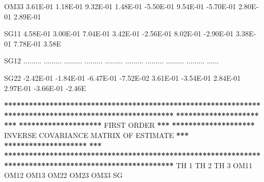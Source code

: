 \documentclass[
  11pt,
  krantz2, a4paper, twoside]{krantz}
\newenvironment{Shaded}{\begin{snugshade}}{\end{snugshade}}
\newcommand{\DecValTok}[1]{\textcolor[rgb]{0.00,0.00,0.81}{#1}}
\newcommand{\ErrorTok}[1]{\textcolor[rgb]{0.64,0.00,0.00}{\textbf{#1}}}
\newcommand{\FloatTok}[1]{\textcolor[rgb]{0.00,0.00,0.81}{#1}}
\newcommand{\NormalTok}[1]{#1}
\newcommand{\OperatorTok}[1]{\textcolor[rgb]{0.81,0.36,0.00}{\textbf{#1}}}
\newcommand{\StringTok}[1]{\textcolor[rgb]{0.31,0.60,0.02}{#1}}
\theoremstyle{definition}
\theoremstyle{definition}
\theoremstyle{definition}
\theoremstyle{remark}
\begin{document}
\begin{Shaded}
\begin{Highlighting}[]
\NormalTok{OM33    }\FloatTok{3.61E{-}01}  \FloatTok{1.18E{-}01}  \FloatTok{9.32E{-}01}  \FloatTok{1.48E{-}01} \FloatTok{{-}5.50E{-}01}  \FloatTok{9.54E{-}01} \FloatTok{{-}5.70E{-}01}  \FloatTok{2.80E{-}01}  \FloatTok{2.89E{-}01}       
                                                                                                       
\NormalTok{SG11    }\FloatTok{4.58E{-}01}  \FloatTok{3.00E{-}01}  \FloatTok{7.04E{-}01}  \FloatTok{3.42E{-}01} \FloatTok{{-}2.56E{-}01}  \FloatTok{8.02E{-}01} \FloatTok{{-}2.90E{-}01}  \FloatTok{3.38E{-}01}  \FloatTok{7.78E{-}01}  \FloatTok{3.58}\NormalTok{E}
                                                                                                       
\NormalTok{SG12   ......... ......... ......... ......... ......... ......... ......... ......... ......... ......}
                                                                                                       
\NormalTok{SG22   }\FloatTok{{-}2.42E{-}01} \FloatTok{{-}1.84E{-}01} \FloatTok{{-}6.47E{-}01} \FloatTok{{-}7.52E{-}02}  \FloatTok{3.61E{-}01} \FloatTok{{-}3.54E{-}01}  \FloatTok{2.84E{-}01}  \FloatTok{2.97E{-}01} \FloatTok{{-}3.66E{-}01} \FloatTok{{-}2.46}\NormalTok{E}
                                                                                                       
                                                                                                       
\OperatorTok{**}\ErrorTok{*****************************************************************************************************}
\ErrorTok{********************}\StringTok{                                                                                }\ErrorTok{***}
\ErrorTok{********************}\StringTok{                                   }\NormalTok{FIRST ORDER                                  }\OperatorTok{**}\ErrorTok{*}
\ErrorTok{********************}\StringTok{                      }\NormalTok{INVERSE COVARIANCE MATRIX OF ESTIMATE                     }\OperatorTok{**}\ErrorTok{*}
\ErrorTok{********************}\StringTok{                                                                                }\ErrorTok{***}
\ErrorTok{*******************************************************************************************************}
\StringTok{                                                                                                       }
\StringTok{                                                                                                       }
\StringTok{           }\NormalTok{TH }\DecValTok{1}\NormalTok{      TH }\DecValTok{2}\NormalTok{      TH }\DecValTok{3}\NormalTok{      OM11      OM12      OM13      OM22      OM23      OM33      SG}
                                                                                                       

\end{Highlighting}
\end{Shaded}
\end{document}
